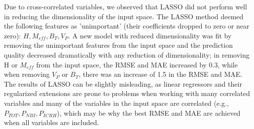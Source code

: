 \documentclass[a4paper, twoside, final, 12pt]{article}
\begin{document}
{Due to cross-correlated variables, we observed that LASSO did not perform well in reducing the dimensionality of the input space. The LASSO method deemed the following features as 'unimportant' (their coefficients dropped to zero or near zero): $H, M_{eff}, B_T, V_P$. A new model with reduced dimensionality was fit by removing the unimportant features from the input space and the prediction quality decreased dramatically with any reduction of dimensionality; in removing H or $M_{eff}$ from the input space, the RMSE and MAE increased by 0.3, while when removing $V_P$ or $B_T$, there was an increase of 1.5 in the RMSE and MAE. 
The results of LASSO can be slightly misleading, as linear regressors and their regularized extensions are prone to problems when working with many correlated variables and many of the variables in the input space are correlated (e.g., $P_{TOT}, P_{NBI}, P_{ICRH}$), which may be why the best RMSE and MAE are achieved when all variables are included.


}
\end{document}
